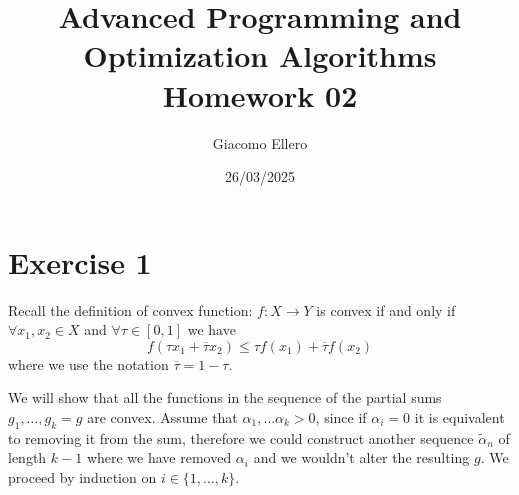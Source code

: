 \documentclass[12pt]{extarticle}
\title{Advanced Programming and Optimization Algorithms \\ Homework 02}
\author{Giacomo Ellero}
\date{26/03/2025}
\numberwithin{equation}{section}
\begin{document}
\maketitle

\section*{Exercise 1}

Recall the definition of convex function: $f: X \to Y$ is convex if and only if
$\forall x_1, x_2 \in X$ and $\forall \tau \in [0, 1]$ we have
\begin{equation}
	f(\tau x_1 + \overline \tau x_2) \leq \tau f(x_1) + \overline \tau f(x_2)
\end{equation}
where we use the notation $\overline \tau = 1 - \tau$.

We will show that all the functions in the sequence of the partial sums $g_1, \dots, g_k = g$ are
convex.
Assume that $\alpha_1, \dots \alpha_k > 0$, since if $\alpha_i = 0$ it is equivalent to removing it
from the sum, therefore we could construct another sequence $\tilde \alpha_n$ of length $k - 1$
where we have removed $\alpha_i$ and we wouldn't alter the resulting $g$.
We proceed by induction on $i \in \{1, \dots, k\}$.
\end{document}
